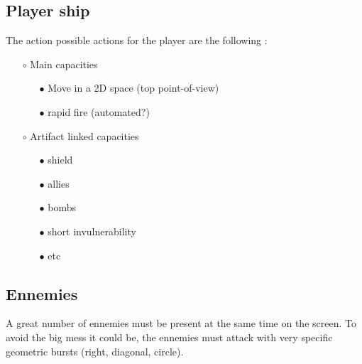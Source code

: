 \documentclass[12pt,a4paper]{article}
\begin{document}
    \subsection{Player ship}
        The action possible actions for the player are the following :
            \begin{itemize}
                \item[$\circ$] Main capacities
                \begin{itemize}
                    \item[$\bullet$] Move in a 2D space (top point-of-view)
                    \item[$\bullet$] rapid fire (automated?)
                \end{itemize}
                \item[$\circ$] Artifact linked capacities
                \begin{itemize}
                    \item[$\bullet$] shield
                    \item[$\bullet$] allies
                    \item[$\bullet$] bombs
                    \item[$\bullet$] short invulnerability
                    \item[$\bullet$] etc

                \end{itemize}
            \end{itemize}
    \subsection{Ennemies}
        A great number of ennemies must be present at the same time on the screen. To avoid the big mess it could be, the ennemies must attack with very specific geometric bursts (right, diagonal, circle).
\end{document}
